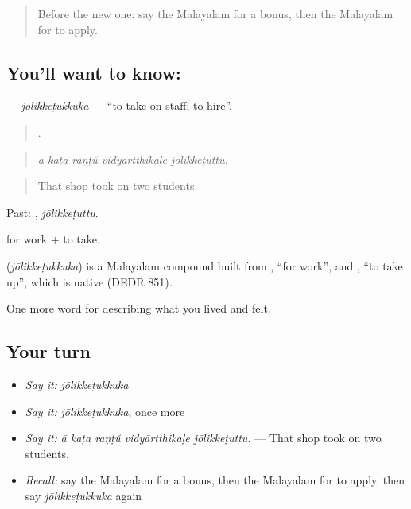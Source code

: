 \label{lesson:ML-C543-jolikketukkuka}



\begin{quote}
Before the new one: say the Malayalam for a bonus, then the Malayalam for to apply.
\end{quote}

\subsection*{You'll want to know: }
\textbf{} — \emph{jōlikkeṭukkuka} — \textquotedblleft{}to take on staff; to hire\textquotedblright{}.

\begin{quote}
    .
\end{quote}

\begin{quote}
\emph{ā kaṭa raṇṭŭ vidyārtthikaḷe jōlikkeṭuttu.}
\end{quote}

\begin{quote}
That shop took on two students.
\end{quote}

Past: , \emph{jōlikkeṭuttu}.

 for work +  to take.

\begin{cousinweb}
\textbf{} (\emph{jōlikkeṭukkuka}) is a Malayalam compound built from , \textquotedblleft{}for work\textquotedblright{}, and , \textquotedblleft{}to take up\textquotedblright{}, which is native (DEDR 851).
\end{cousinweb}

\begin{grammarlens}[title={What you've built}]
One more word for describing what you lived and felt.
\end{grammarlens}

\subsection*{Your turn}
\begin{itemize}
\raggedright
  \item \emph{Say it:} \emph{jōlikkeṭukkuka}
  \item \emph{Say it:} \emph{jōlikkeṭukkuka}, once more
  \item \emph{Say it:} \emph{ā kaṭa raṇṭŭ vidyārtthikaḷe jōlikkeṭuttu.} — That shop took on two students.
  \item \emph{Recall:} say the Malayalam for a bonus, then the Malayalam for to apply, then say \emph{jōlikkeṭukkuka} again
\end{itemize}

